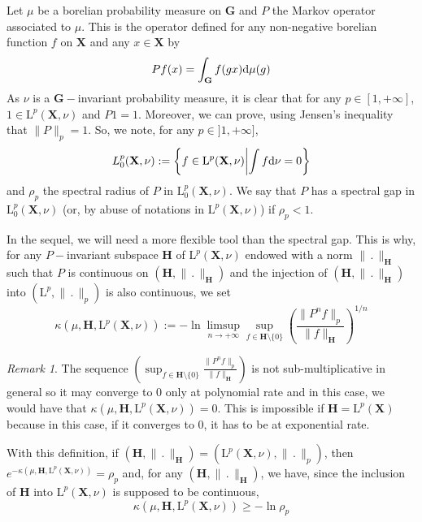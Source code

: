\documentclass[11pt]{amsart}
\theoremstyle{definition}
\theoremstyle{remark}
\newtheorem{remark}[theorem]{Remark}
\numberwithin{equation}{section}
\begin{document}
Let $\mu$ be a borelian probability measure on ${\mathbf G}$ and $P$ the Markov operator associated to $\mu$. This is the operator defined for any non-negative borelian function $f$ on ${\mathbf X}$ and any $x\in {\mathbf X}$ by
\[
Pf(x) = \int_{\mathbf G} f(gx) {{\rm d}}\mu(g)
\]
As $\nu$ is a ${\mathbf G}-$invariant probability measure, it is clear that for any $p\in[1,+\infty]$, $1\in \mathrm{L}^p({\mathbf X},\nu)$ and $P1=1$. Moreover, we can prove, using Jensen's inequality that $\|P\|_p= 1$. So, we note, for any $p\in ]1,+\infty]$,
\[
L^p_0({\mathbf X},\nu):= \left\{ f\in \mathrm{L}^p({\mathbf X},\nu)\middle| \int f{{\rm d}}\nu=0 \right\}
\]
and $\rho_p$ the spectral radius of $P$ in $\mathrm{L}^p_0({\mathbf X},\nu)$. We say that $P$ has a spectral gap in $\mathrm{L}^p_0({\mathbf X},\nu)$ (or, by abuse of notations in $\mathrm{L}^p({\mathbf X},\nu)$) if $\rho_p<1$.

In the sequel, we will need a more flexible tool than the spectral gap. This is why, for any $P-$invariant subspace ${\mathbf H}$ of $\mathrm{L}^p({\mathbf X},\nu)$ endowed with a norm $\|\,.\,\|_{\mathbf H}$ such that $P$ is continuous on $ ({\mathbf H},\|\,.\,\|_{\mathbf H})$ and the injection of $({\mathbf H},\|\,.\,\|_{\mathbf H})$ into $(\mathrm{L}^p, \|\,.\,\|_p)$ is also continuous, we set
\[
\kappa(\mu,{\mathbf H}, \mathrm{L}^p\left({\mathbf X},\nu\right) ) := -\ln \limsup_{n\to +\infty} \sup_{f\in {\mathbf H}\setminus\{0\}} \left( \frac{\|P^n f\|_{p}}{\|f\|_{\mathbf H}} \right)^{1/n}
\]
\begin{remark}
The sequence $\left( \sup_{f\in {\mathbf H} \setminus\{0\}} \frac{\|P^n f\|_{p}}{\|f\|_{\mathbf H}} \right)$ is not sub-multiplicative in general so it may converge to $0$ only at polynomial rate and in this case, we would have that $\kappa(\mu,{\mathbf H}, \mathrm{L}^p\left({\mathbf X},\nu\right) )=0$. This is impossible if ${\mathbf H} = \mathrm{L}^p({\mathbf X})$ because in this case, if it converges to $0$, it has to be at exponential rate.
\end{remark}

With this definition, if $({\mathbf H},\|\,.\,\|_{\mathbf H})= (\mathrm{L}^p({\mathbf X},\nu), \|\,.\,\|_p)$, then $e^{-\kappa(\mu,{\mathbf H}, \mathrm{L}^p\left({\mathbf X},\nu\right) )} = \rho_p$ and, for any $({\mathbf H},\|\,.\,\|_{\mathbf H})$, we have, since the inclusion of ${\mathbf H}$ into $\mathrm{L}^p({\mathbf X},\nu)$ is supposed to be continuous,
\[
\kappa(\mu,{\mathbf H}, \mathrm{L}^p\left({\mathbf X},\nu\right) ) \geqslant -\ln \rho_p
\]
\end{document}
